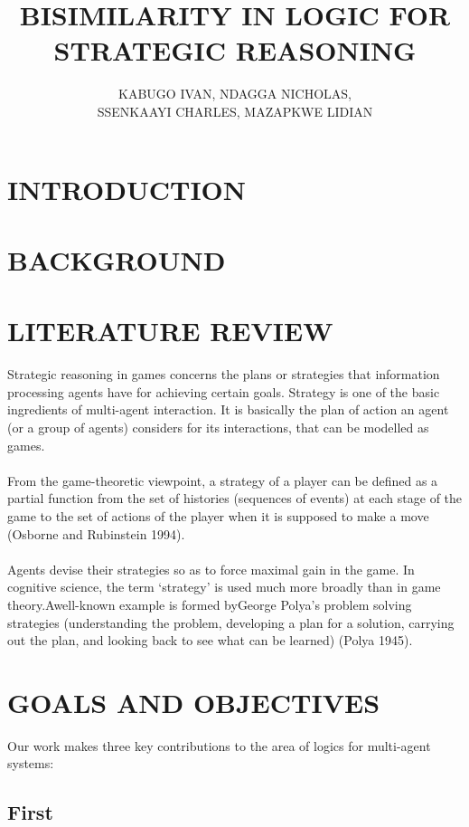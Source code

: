 \documentclass[10pt,a4paper]{article}
\begin{document}
\author{KABUGO IVAN, NDAGGA NICHOLAS,\\ SSENKAAYI CHARLES, MAZAPKWE LIDIAN}
\title{\textbf{BISIMILARITY IN LOGIC FOR STRATEGIC REASONING}}
\maketitle
\section{INTRODUCTION}

\section{BACKGROUND}	


\section{ LITERATURE REVIEW }
Strategic reasoning in games concerns the plans or strategies that information processing
agents have for achieving certain goals. Strategy is one of the basic ingredients
of multi-agent interaction. It is basically the plan of action an agent (or a group
of agents) considers for its interactions, that can be modelled as games.\\\\ From the
game-theoretic viewpoint, a strategy of a player can be defined as a partial function
from the set of histories (sequences of events) at each stage of the game to the set of
actions of the player when it is supposed to make a move (Osborne and Rubinstein
1994).\\\\ Agents devise their strategies so as to force maximal gain in the game.
In cognitive science, the term ‘strategy’ is used much more broadly than in game
theory.Awell-known example is formed byGeorge Polya’s problem solving strategies
(understanding the problem, developing a plan for a solution, carrying out the plan, and
looking back to see what can be learned) (Polya 1945).



\section{GOALS AND OBJECTIVES}	
Our work makes three key contributions to the area of logics for multi-agent systems:
\subsection{First}
\end{document}
